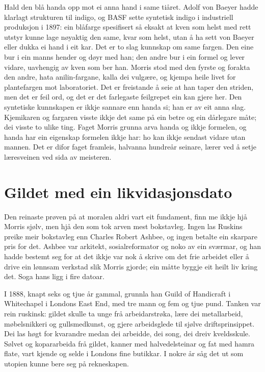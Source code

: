 Hald den blå handa opp mot ei anna hand i same tiåret. Adolf von Baeyer hadde klarlagt strukturen til indigo, og BASF sette syntetisk indigo i industriell produksjon i 1897: ein blåfarge spesifisert så eksakt at kven som helst med rett utstyr kunne lage nøyaktig den same, kvar som helst, utan å ha sett von Baeyer eller dukka ei hand i eit kar. Det er to slag kunnskap om same fargen. Den eine bur i ein manns hender og døyr med han; den andre bur i ein formel og lever vidare, uavhengig av kven som ber han. Morris stod med den fyrste og forakta den andre, hata anilin-fargane, kalla dei vulgære, og kjempa heile livet for plantefargen mot laboratoriet. Det er freistande å seie at han taper den striden, men det er feil ord, og det er det farlegaste feilgrepet ein kan gjere her. Den syntetiske kunnskapen er ikkje sannare enn handa si; han er av eit anna slag. Kjemikaren og fargaren visste ikkje det same på ein betre og ein dårlegare måte; dei visste to ulike ting. Faget Morris grunna arva handa og ikkje formelen, og handa har ein eigenskap formelen ikkje har: ho kan ikkje sendast vidare utan mannen. Det er difor faget framleis, halvanna hundreår seinare, lærer ved å setje læresveinen ved sida av meisteren.

\section{Gildet med ein likvidasjonsdato}

Den reinaste prøven på at moralen aldri vart eit fundament, finn me ikkje hjå Morris sjølv, men hjå den som tok arven mest bokstavleg. Ingen las Ruskins preike meir bokstavleg enn Charles Robert Ashbee, og ingen betalte ein skarpare pris for det. Ashbee var arkitekt, sosialreformator og noko av ein sværmar, og han hadde bestemt seg for at det ikkje var nok å skrive om det frie arbeidet eller å drive ein lønnsam verkstad slik Morris gjorde; ein måtte byggje eit heilt liv kring det. Soga hans ligg i fire datoar.

I 1888, knapt seks og tjue år gammal, grunnla han Guild of Handicraft i Whitechapel i Londons East End, med tre mann og fem og tjue pund. Tanken var rein ruskinsk: gildet skulle ta unge frå arbeidarstrøka, lære dei metallarbeid, møbelsnikkeri og gullsmedkunst, og gjere arbeidsglede til sjølve driftsprinsippet. Dei las høgt for kvarandre medan dei arbeidde, dei song, dei dreiv kveldsskule. Sølvet og kopararbeida frå gildet, kanner med halvedelsteinar og fat med hamra flate, vart kjende og selde i Londons fine butikkar. I nokre år såg det ut som utopien kunne bere seg på rekneskapen.

